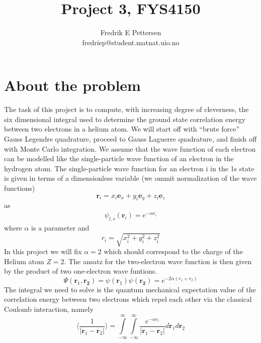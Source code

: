 \documentclass[a4paper,english, 10pt, twoside]{article}
\title{Project 3, FYS4150}
\author{Fredrik E Pettersen\\ fredriep@student.matnat.uio.no}
\begin{document}
\maketitle

% 

\section*{About the problem}
The task of this project is to compute, with increasing degree of cleverness, the six dimensional integral used to determine the 
ground state correlation energy between two electrons in a helium atom. We will start off with ``brute force'' Gauss Legendre 
quadrature, proceed to Gauss Laguerre quadrature, and finish off with Monte Carlo integration. We assume that the wave function 
of each electron can be modelled like the single-particle wave function of an electron in the hydrogen atom. The single-particle 
wave function for an electron i in the 1s state is given in terms of a dimensionless variable (we ommit normalization of the wave 
functions)
$$
\mathbf{r}_i = x_i\mathbf{e}_x + y_i\mathbf{e}_y + z_i\mathbf{e}_z
$$
as
\begin{align*}
 \psi_{l,s}(\mathbf{r}_i) = e^{-\alpha r_i}
\end{align*}
where $\alpha$ is a parameter and 
$$
r_i = \sqrt{x_i^2 + y_i^2 + z_i^2}
$$
In this project we will fix $\alpha = 2$ which should correspond to the charge of the Helium atom $Z = 2$.
The ansatz for the two-electron wave function is then given by the product of two one-electron wave funtions.
$$
\Psi(\mathbf{r}_1,\mathbf{r_2}) = \psi(\mathbf{r}_1)\psi(\mathbf{r_2}) = e^{-2\alpha(r_1+r_2)}
$$
The integral we need to solve is the quantum mechanical expectation value of the
correlation energy between two electrons which repel each other via the classical Coulomb
interaction, namely
$$
\langle\frac{1}{\left|\mathbf{r}_1-\mathbf{r}_2\right|}\rangle = \int\limits^\infty_{-\infty}\int\limits^\infty_{-\infty}
\frac{ e^{-\alpha r_i}}{\left|\mathbf{r}_1-\mathbf{r}_2\right|}d\mathbf{r}_1d\mathbf{r}_2
$$
\end{document}
